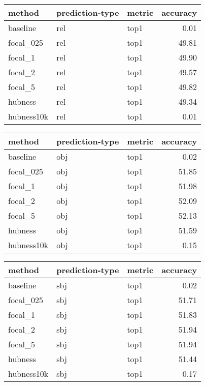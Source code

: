 \begin{tabular}{lllr}
\toprule
     method & prediction-type & metric &  accuracy \\
\midrule
   baseline &             rel &   top1 &      0.01 \\
  focal\_025 &             rel &   top1 &     49.81 \\
    focal\_1 &             rel &   top1 &     49.90 \\
    focal\_2 &             rel &   top1 &     49.57 \\
    focal\_5 &             rel &   top1 &     49.82 \\
    hubness &             rel &   top1 &     49.34 \\
 hubness10k &             rel &   top1 &      0.01 \\
\bottomrule
\end{tabular}
\begin{tabular}{lllr}
\toprule
     method & prediction-type & metric &  accuracy \\
\midrule
   baseline &             obj &   top1 &      0.02 \\
  focal\_025 &             obj &   top1 &     51.85 \\
    focal\_1 &             obj &   top1 &     51.98 \\
    focal\_2 &             obj &   top1 &     52.09 \\
    focal\_5 &             obj &   top1 &     52.13 \\
    hubness &             obj &   top1 &     51.59 \\
 hubness10k &             obj &   top1 &      0.15 \\
\bottomrule
\end{tabular}
\begin{tabular}{lllr}
\toprule
     method & prediction-type & metric &  accuracy \\
\midrule
   baseline &             sbj &   top1 &      0.02 \\
  focal\_025 &             sbj &   top1 &     51.71 \\
    focal\_1 &             sbj &   top1 &     51.83 \\
    focal\_2 &             sbj &   top1 &     51.94 \\
    focal\_5 &             sbj &   top1 &     51.94 \\
    hubness &             sbj &   top1 &     51.44 \\
 hubness10k &             sbj &   top1 &      0.17 \\
\bottomrule
\end{tabular}
